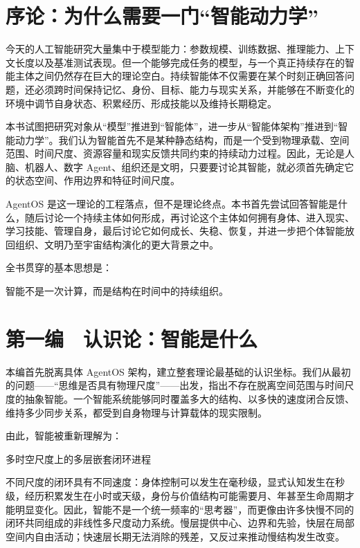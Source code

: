 \part{序论：为什么需要一门“智能动力学”}
今天的人工智能研究大量集中于模型能力：参数规模、训练数据、推理能力、上下文长度以及基准测试表现。但一个能够完成任务的模型，与一个真正持续存在的智能主体之间仍然存在巨大的理论空白。持续智能体不仅需要在某个时刻正确回答问题，还必须跨时间保持记忆、身份、目标、能力与现实关系，并能够在不断变化的环境中调节自身状态、积累经历、形成技能以及维持长期稳定。

本书试图把研究对象从“模型”推进到“智能体”，进一步从“智能体架构”推进到“智能动力学”。我们认为智能首先不是某种静态结构，而是一个受到物理承载、空间范围、时间尺度、资源容量和现实反馈共同约束的持续动力过程。因此，无论是人脑、机器人、数字 Agent、组织还是文明，只要要讨论其智能，就必须首先确定它的状态空间、作用边界和特征时间尺度。

AgentOS 是这一理论的工程落点，但不是理论终点。本书首先尝试回答智能是什么，随后讨论一个持续主体如何形成，再讨论这个主体如何拥有身体、进入现实、学习技能、管理自身，最后讨论它如何成长、失稳、恢复，并进一步把个体智能放回组织、文明乃至宇宙结构演化的更大背景之中。

全书贯穿的基本思想是：

\begin{statementbox}
智能不是一次计算，而是结构在时间中的持续组织。
\end{statementbox}




\part{第一编　认识论：智能是什么}
本编首先脱离具体 AgentOS 架构，建立整套理论最基础的认识坐标。我们从最初的问题——“思维是否具有物理尺度”——出发，指出不存在脱离空间范围与时间尺度的抽象智能。一个智能系统能够同时覆盖多大的结构、以多快的速度闭合反馈、维持多少同步关系，都受到自身物理与计算载体的现实限制。

由此，智能被重新理解为：

\begin{statementbox}
多时空尺度上的多层嵌套闭环进程
\end{statementbox}

不同尺度的闭环具有不同速度：身体控制可以发生在毫秒级，显式认知发生在秒级，经历积累发生在小时或天级，身份与价值结构可能需要月、年甚至生命周期才能明显变化。因此，智能不是一个统一频率的“思考器”，而更像由许多快慢不同的闭环共同组成的非线性多尺度动力系统。慢层提供中心、边界和先验，快层在局部空间内自由活动；快速层长期无法消除的残差，又反过来推动慢结构发生改变。

